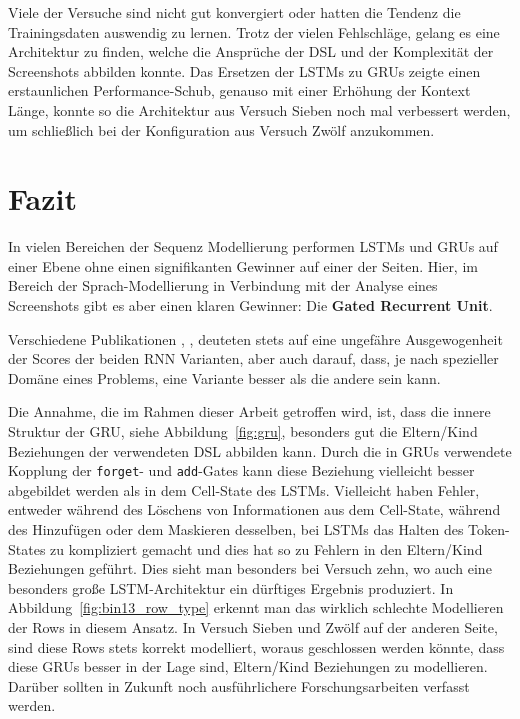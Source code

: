 \documentclass[pdftex,a4paper,halfparskip, article]{scrartcl}
\begin{document}
Viele der Versuche sind nicht gut konvergiert oder hatten die Tendenz die Trainingsdaten auswendig zu lernen. Trotz der vielen Fehlschläge, gelang es eine Architektur zu finden, welche die Ansprüche der DSL und der Komplexität der Screenshots abbilden konnte. 
Das Ersetzen der LSTMs zu GRUs zeigte einen erstaunlichen Performance-Schub, genauso mit einer Erhöhung der Kontext Länge, konnte so die Architektur aus Versuch Sieben noch mal verbessert werden, um schließlich bei der Konfiguration aus Versuch Zwölf anzukommen. 


\section{Fazit}

In vielen Bereichen der Sequenz Modellierung performen LSTMs und GRUs auf einer Ebene ohne einen signifikanten Gewinner auf einer der Seiten. Hier, im Bereich der Sprach-Modellierung in Verbindung mit der Analyse eines Screenshots gibt es aber einen klaren Gewinner: Die \textbf{Gated Recurrent Unit}.

Verschiedene Publikationen \cite{paperGRUComparison}, \cite{lstmSearchSpace}, \cite{colahsBlogLSTM} deuteten stets auf eine ungefähre Ausgewogenheit der Scores der beiden RNN Varianten, aber auch darauf, dass, je nach spezieller Domäne eines Problems, eine Variante besser als die andere sein kann.

Die Annahme, die im Rahmen dieser Arbeit getroffen wird, ist, dass die innere Struktur der GRU, siehe Abbildung~\ref{fig:gru}, besonders gut die Eltern/Kind Beziehungen der verwendeten DSL abbilden kann. Durch die in GRUs verwendete Kopplung der \texttt{forget}- und \texttt{add}-Gates kann diese Beziehung vielleicht besser abgebildet werden als in dem Cell-State des LSTMs. Vielleicht haben Fehler, entweder während des Löschens von Informationen aus dem Cell-State, während des Hinzufügen oder dem Maskieren desselben, bei LSTMs das Halten des Token-States zu kompliziert gemacht und dies hat so zu Fehlern in den Eltern/Kind Beziehungen geführt. Dies sieht man besonders bei Versuch zehn, wo auch eine besonders große LSTM-Architektur ein dürftiges Ergebnis produziert. In Abbildung~\ref{fig:bin13_row_type} erkennt man das wirklich schlechte Modellieren der Rows in diesem Ansatz. In Versuch Sieben und Zwölf auf der anderen Seite, sind diese Rows stets korrekt modelliert, woraus geschlossen werden könnte, dass diese GRUs besser in der Lage sind, Eltern/Kind Beziehungen zu modellieren. Darüber sollten in Zukunft noch ausführlichere Forschungsarbeiten verfasst werden.
\end{document}
